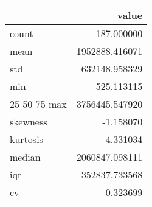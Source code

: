 \begin{tabular}{lr}
\toprule
 & value \\
\midrule
count & 187.000000 \\
mean & 1952888.416071 \\
std & 632148.958329 \\
min & 525.113115 \\
25%
50%
75%
max & 3756445.547920 \\
skewness & -1.158070 \\
kurtosis & 4.331034 \\
median & 2060847.098111 \\
iqr & 352837.733568 \\
cv & 0.323699 \\
\bottomrule
\end{tabular}
